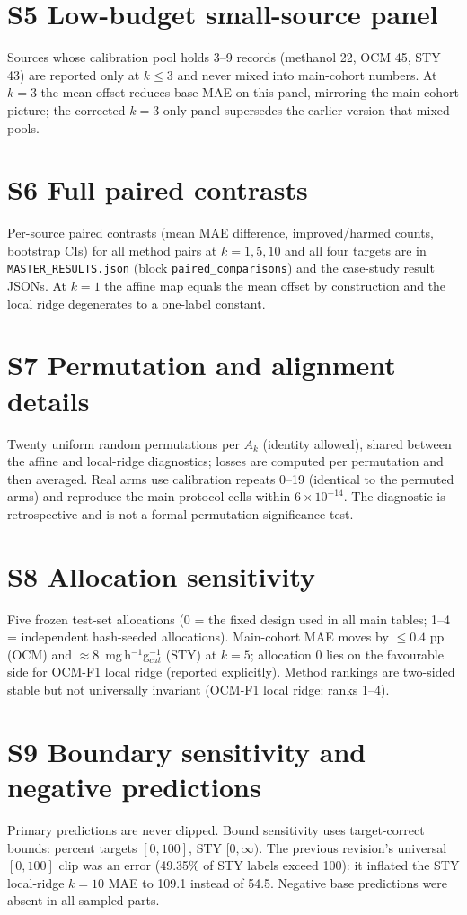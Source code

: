\documentclass[11pt,a4paper]{article}
\begin{document}
\section{S5 Low-budget small-source panel}
Sources whose calibration pool holds 3--9 records (methanol 22, OCM 45, STY 43) are
reported only at $k\le3$ and never mixed into main-cohort numbers. At $k=3$ the mean
offset reduces base MAE on this panel, mirroring the main-cohort picture; the corrected
$k=3$-only panel supersedes the earlier version that mixed pools.

\section{S6 Full paired contrasts}
Per-source paired contrasts (mean MAE difference, improved/harmed counts, bootstrap CIs)
for all method pairs at $k=1,5,10$ and all four targets are in
\texttt{MASTER\_RESULTS.json} (block \texttt{paired\_comparisons}) and the case-study
result JSONs. At $k=1$ the affine map equals the mean offset by construction and the
local ridge degenerates to a one-label constant.

\section{S7 Permutation and alignment details}
Twenty uniform random permutations per $A_k$ (identity allowed), shared between the
affine and local-ridge diagnostics; losses are computed per permutation and then
averaged. Real arms use calibration repeats 0--19 (identical to the permuted arms) and
reproduce the main-protocol cells within $6\times10^{-14}$. The diagnostic is
retrospective and is not a formal permutation significance test.

\section{S8 Allocation sensitivity}
Five frozen test-set allocations (0 = the fixed design used in all main tables; 1--4 =
independent hash-seeded allocations). Main-cohort MAE moves by $\le0.4$ pp (OCM) and
$\approx8$~mg\,h$^{-1}$g$_{cat}^{-1}$ (STY) at $k=5$; allocation 0 lies on the
favourable side for OCM-F1 local ridge (reported explicitly). Method rankings are
two-sided stable but not universally invariant (OCM-F1 local ridge: ranks 1--4).

\section{S9 Boundary sensitivity and negative predictions}
Primary predictions are never clipped. Bound sensitivity uses target-correct bounds:
percent targets $[0,100]$, STY $[0,\infty)$. The previous revision's universal
$[0,100]$ clip was an error (49.35\% of STY labels exceed 100): it inflated the STY
local-ridge $k{=}10$ MAE to 109.1 instead of 54.5. Negative base predictions were absent
in all sampled parts.
\end{document}
